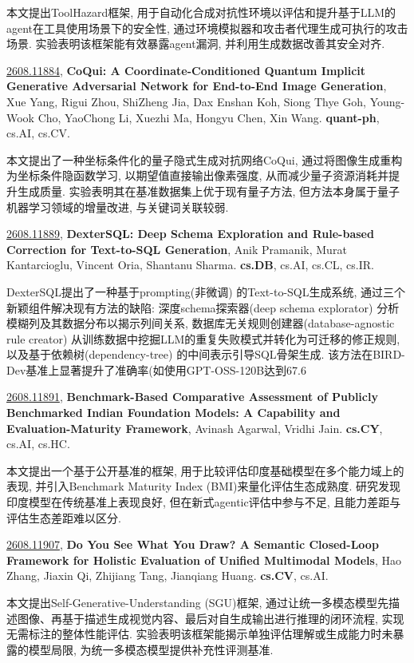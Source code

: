 \documentclass[9pt, a4paper]{article}
\theoremstyle{plain}
\theoremstyle{definition}
\theoremstyle{remark}
\newcommand{\arxivwithtarget}[3]{\hypertarget{#1}{}\href{https://arxiv.org/abs/#1}{#1}, \textbf{\textcolor{arxivblue}{#2}}, #3. }
\begin{document}
本文提出ToolHazard框架, 用于自动化合成对抗性环境以评估和提升基于LLM的agent在工具使用场景下的安全性, 通过环境模拟器和攻击者代理生成可执行的攻击场景. 实验表明该框架能有效暴露agent漏洞, 并利用生成数据改善其安全对齐.


\arxivwithtarget{2608.11884}{CoQui: A Coordinate-Conditioned Quantum Implicit Generative Adversarial Network for End-to-End Image Generation}{Xue Yang, Rigui Zhou, ShiZheng Jia, Dax Enshan Koh, Siong Thye Goh, Young-Wook Cho, YaoChong Li, Xuezhi Ma, Hongyu Chen, Xin Wang}\textbf{quant-ph}, cs.AI, cs.CV.

本文提出了一种坐标条件化的量子隐式生成对抗网络CoQui, 通过将图像生成重构为坐标条件隐函数学习, 以期望值直接输出像素强度, 从而减少量子资源消耗并提升生成质量. 实验表明其在基准数据集上优于现有量子方法, 但方法本身属于量子机器学习领域的增量改进, 与关键词关联较弱.


\arxivwithtarget{2608.11889}{DexterSQL: Deep Schema Exploration and Rule-based Correction for Text-to-SQL Generation}{Anik Pramanik, Murat Kantarcioglu, Vincent Oria, Shantanu Sharma}\textbf{cs.DB}, cs.AI, cs.CL, cs.IR.

DexterSQL提出了一种基于prompting(非微调) 的Text-to-SQL生成系统, 通过三个新颖组件解决现有方法的缺陷: 深度schema探索器(deep schema explorator) 分析模糊列及其数据分布以揭示列间关系, 数据库无关规则创建器(database-agnostic rule creator) 从训练数据中挖掘LLM的重复失败模式并转化为可迁移的修正规则, 以及基于依赖树(dependency-tree) 的中间表示引导SQL骨架生成. 该方法在BIRD-Dev基准上显著提升了准确率(如使用GPT-OSS-120B达到67.6%


\arxivwithtarget{2608.11891}{Benchmark-Based Comparative Assessment of Publicly Benchmarked Indian Foundation Models: A Capability and Evaluation-Maturity Framework}{Avinash Agarwal, Vridhi Jain}\textbf{cs.CY}, cs.AI, cs.HC.

本文提出一个基于公开基准的框架, 用于比较评估印度基础模型在多个能力域上的表现, 并引入Benchmark Maturity Index (BMI)来量化评估生态成熟度. 研究发现印度模型在传统基准上表现良好, 但在新式agentic评估中参与不足, 且能力差距与评估生态差距难以区分.


\arxivwithtarget{2608.11907}{Do You See What You Draw? A Semantic Closed-Loop Framework for Holistic Evaluation of Unified Multimodal Models}{Hao Zhang, Jiaxin Qi, Zhijiang Tang, Jianqiang Huang}\textbf{cs.CV}, cs.AI.

本文提出Self-Generative-Understanding (SGU)框架, 通过让统一多模态模型先描述图像、再基于描述生成视觉内容、最后对自生成输出进行推理的闭环流程, 实现无需标注的整体性能评估. 实验表明该框架能揭示单独评估理解或生成能力时未暴露的模型局限, 为统一多模态模型提供补充性评测基准.
\end{document}
